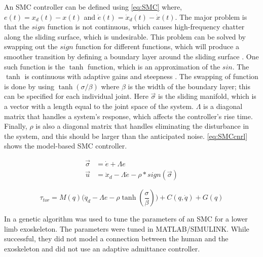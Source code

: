 An SMC controller can be defined using \autoref{eq:SMC} where, $e(t) = x_d(t) - x(t)$ and $\dot{e}(t) = \dot{x}_d(t) - \dot{x}(t)$. The major problem is that the $sign$ function is not continuous, which causes high-frequency chatter along the sliding surface, which is undesirable. This problem can be solved by swapping out the $sign$  function for different functions, which will produce a smoother transition by defining a boundary layer around the sliding surface \cite{babaiasl2015sliding}. One such function is the $\tanh$ function, which is an approximation of the $sin$. The $\tanh$ is continuous with adaptive gains and steepness \cite{aghababa2012chattering}. The swapping of function is done by using $\tanh(\sigma / \beta)$ where $\beta$ is the width of the boundary layer; this can be specified for each individual joint. Here $\vec{\sigma}$ is the sliding manifold, which is a vector with a length equal to the joint space of the system. $\Lambda$ is a diagonal matrix that handles a system's response, which affects the controller's rise time. Finally, $\rho$ is also a diagonal matrix that handles eliminating the disturbance in the system, and this should be larger than the anticipated noise.  \autoref{eq:SMCcnrl} shows the model-based SMC controller.

\begin{equation}
   \begin{aligned} 
        \vec{\sigma} &=  \dot{e}  + \Lambda e \\
        \vec{u} &= \ddot{x}_d - \Lambda \dot{e} - \rho * sign(\vec{\sigma})
    \end{aligned}
    \label{eq:SMC}
\end{equation}






\begin{equation}
        \tau_{tor} = M(q) \Big( \ddot{q}_d  - \Lambda e - \rho \tanh(\frac{\sigma}{\beta}) \Big) + C( q, \dot{q} ) + G(q) 
    \label{eq:SMCcnrl}
\end{equation}






In \cite{long2016robust} a genetic algorithm was used to tune the parameters of an SMC for a lower limb exoskeleton. The parameters were tuned in MATLAB/SIMULINK. While successful, they did not model a connection between the human and the exoskeleton and did not use an adaptive admittance controller. 

